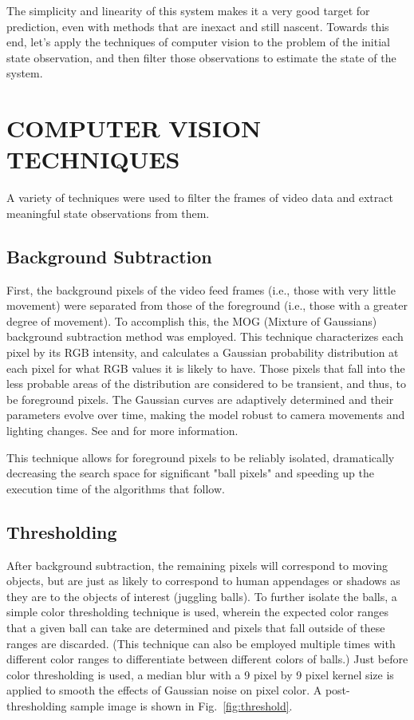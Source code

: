 \documentclass[letterpaper, 10 pt, conference]{ieeeconf}  %
\begin{document}
The simplicity and linearity of this system makes it a very good target for prediction, even with methods that are inexact and still nascent. Towards this end, let's apply the techniques of computer vision to the problem of the initial state observation, and then filter those observations to estimate the state of the system.

\section{COMPUTER VISION TECHNIQUES}

A variety of techniques were used to filter the frames of video data and extract meaningful state observations from them.

\subsection{Background Subtraction}

First, the background pixels of the video feed frames (i.e., those with very little movement) were separated from those of the foreground (i.e., those with a greater degree of movement). To accomplish this, the MOG (Mixture of Gaussians) background subtraction method was employed. This technique characterizes each pixel by its RGB intensity, and calculates a Gaussian probability distribution at each pixel for what RGB values it is likely to have. Those pixels that fall into the less probable areas of the distribution are considered to be transient, and thus, to be foreground pixels. The Gaussian curves are adaptively determined and their parameters evolve over time, making the model robust to camera movements and lighting changes. See \cite{zoran1} and \cite{zoran2} for more information.

This technique allows for foreground pixels to be reliably isolated, dramatically decreasing the search space for significant "ball pixels" and speeding up the execution time of the algorithms that follow.

\subsection{Thresholding}

After background subtraction, the remaining pixels will correspond to moving objects, but are just as likely to correspond to human appendages or shadows as they are to the objects of interest (juggling balls). To further isolate the balls, a simple color thresholding technique is used, wherein the expected color ranges that a given ball can take are determined and pixels that fall outside of these ranges are discarded. (This technique can also be employed multiple times with different color ranges to differentiate between different colors of balls.) Just before color thresholding is used, a median blur with a 9 pixel by 9 pixel kernel size is applied to smooth the effects of Gaussian noise on pixel color. A post-thresholding sample image is shown in Fig.~\ref{fig:threshold}.
\end{document}
